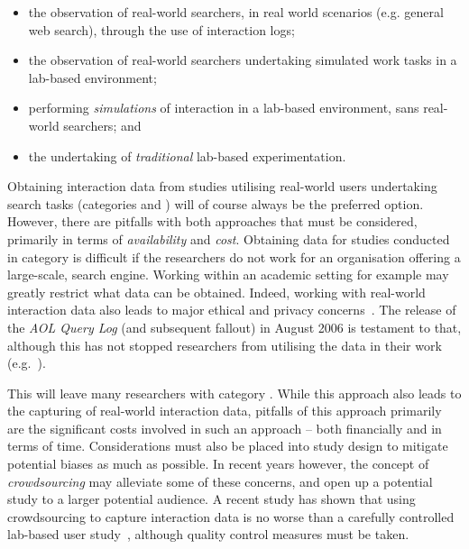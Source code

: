 \begin{itemize}
    \item[\blueboxbold{1}]{the observation of real-world searchers, in real world scenarios (e.g. general web search), through the use of interaction logs;}
    \item[\blueboxbold{2}]{the observation of real-world searchers undertaking simulated work tasks in a lab-based environment;}
    \item[\blueboxbold{3}]{performing \emph{simulations} of interaction in a lab-based environment, sans real-world searchers; and}
    \item[\blueboxbold{4}]{the undertaking of \emph{traditional} lab-based experimentation.}    
\end{itemize}

Obtaining interaction data from studies utilising real-world users undertaking search tasks (categories  and ) will of course always be the preferred option. However, there are pitfalls with both approaches that must be considered, primarily in terms of \emph{availability} and \emph{cost}. Obtaining data for studies conducted in category  is difficult if the researchers do not work for an organisation offering a large-scale, search engine. Working within an academic setting for example may greatly restrict what data can be obtained. Indeed, working with real-world interaction data also leads to major ethical and privacy concerns~\citep{korolova2009aol_query_log_privacy}. The release of the \emph{AOL Query Log} (and subsequent fallout) in August 2006 is testament to that, although this has not stopped researchers from utilising the data in their work (e.g.~\citealp{brenes2009aol_query_log}).

This will leave many researchers with category . While this approach also leads to the capturing of real-world interaction data, pitfalls of this approach primarily are the significant costs involved in such an approach -- both financially and in terms of time. Considerations must also be placed into study design to mitigate potential biases as much as possible. In recent years however, the concept of \emph{crowdsourcing} may alleviate some of these concerns, and open up a potential study to a larger potential audience. A recent study has shown that using crowdsourcing to capture interaction data is no worse than a carefully controlled lab-based user study~\citep{zuccon2013crowdsourcing_comparisons}, although quality control measures must be taken.

